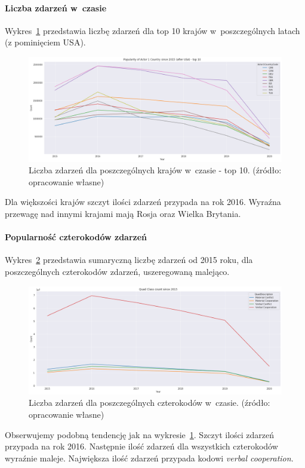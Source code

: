 \documentclass[11pt]{report}
\begin{document}
    \paragraph{Liczba zdarzeń w~czasie}
    Wykres~\ref{fig:GLOBALactor1inTime} przedstawia liczbę zdarzeń dla top 10 krajów w~poszczególnych latach (z pominięciem USA).
    \begin{figure}[!htp]
        \centering
        \includegraphics[width=\linewidth]{fig/GLOBAL/Actor1inTIMEafterUSA.png}
        \caption{Liczba zdarzeń dla poszczególnych krajów w~czasie - top 10. (źródło: opracowanie własne)}
        \label{fig:GLOBALactor1inTime}
    \end{figure}
    Dla większości krajów szczyt ilości zdarzeń przypada na rok 2016.
    Wyraźna przewagę nad innymi krajami mają Rosja oraz Wielka Brytania.

    \paragraph{Popularność czterokodów zdarzeń}
    Wykres~\ref{fig:GLOBALQC} przedstawia sumaryczną liczbę zdarzeń od 2015 roku, dla poszczególnych czterokodów zdarzeń, uszeregowaną malejąco.
    \begin{figure}[!htp]
        \centering
        \includegraphics[width=\linewidth]{fig/GLOBAL/QC.png}
        \caption{Liczba zdarzeń dla poszczególnych czterokodów w~czasie. (źródło: opracowanie własne)}
        \label{fig:GLOBALQC}
    \end{figure}
    Obserwujemy podobną tendencję jak na wykresie~\ref{fig:GLOBALactor1inTime}.
    Szczyt ilości zdarzeń przypada na rok 2016.
    Następnie ilość zdarzeń dla wszystkich czterokodów wyraźnie maleje.
    Największa ilość zdarzeń przypada kodowi \textit{verbal cooperation}.
\end{document}
